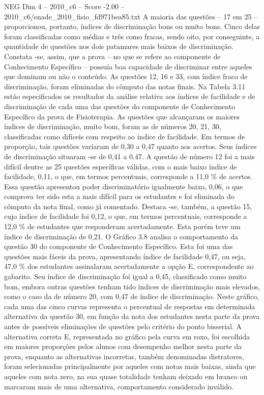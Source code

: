 \begin{textsample}{NEG Dim 4 – 2010\_c6 – Score -2.00 – 2010\_c6/enade\_2010\_fisio\_fd971bea85.txt}
A maioria das questões – 17 em 25 – proporcionou, portanto, índices de discriminação bons ou muito bons.
Cinco delas foram classificadas como médias e três como fracas, sendo oito, por conseguinte, a quantidade de questões nos dois patamares mais baixos de discriminação.
Constata -se, assim, que a prova – no que se refere ao componente de Conhecimento Específico – possuía boa capacidade de discriminar entre aqueles que dominam ou não o conteúdo.
As questões 12, 16 e 33, com índice fraco de discriminação, foram eliminadas do cômputo das notas finais.
Na Tabela 3.11 estão especificados os resultados da análise relativa aos índices de facilidade e de discriminação de cada uma das questões do componente de Conhecimento Específico da prova de Fisioterapia.
As questões que alcançaram os maiores índices de discriminação, muito bom, foram as de números 20, 21, 30, classificadas como difíceis com respeito ao índice de facilidade.
Em termos de proporção, tais questões variaram de 0,30 a 0,47 quanto aos acertos.
Seus índices de discriminação situaram -se de 0,41 a 0,47.
A questão de número 12 foi a mais difícil dentre as 25 questões específicas válidas, com o mais baixo índice de facilidade, 0,11, o que, em termos percentuais, corresponde a 11,0 \% de acertos.
Essa questão apresentou poder discriminatório igualmente baixo, 0,06, o que comprova ter sido esta a mais difícil para os estudantes e foi eliminada do cômputo da nota final, como já comentado.
Destaca -se, também, a questão 15, cujo índice de facilidade foi 0,12, o que, em termos percentuais, corresponde a 12,0 \% de estudantes que responderam acertadamente.
Esta porém teve um índice de discriminação de 0,21.
O Gráfico 3.8 analisa o comportamento da questão 30 do componente de Conhecimento Específico.
Esta foi uma das questões mais fáceis da prova, apresentando índice de facilidade 0,47, ou seja, 47,0 \% dos estudantes assinalaram acertadamente a opção E, correspondente ao gabarito.
Seu índice de discriminação foi igual a 0,45, classificado como muito bom, embora outras questões tenham tido índices de discriminação mais elevados, como o caso da de número 20, com 0,47 de índice de discriminação.
Neste gráfico, cada uma das cinco curvas representa o percentual de respostas em determinada alternativa da questão 30, em função da nota dos estudantes nesta parte da prova antes de possíveis eliminações de questões pelo critério do ponto bisserial.
A alternativa correta E, representada no gráfico pela curva em roxo, foi escolhida em maiores proporções pelos alunos com desempenho melhor nesta parte da prova, enquanto as alternativas incorretas, também denominadas distratores, foram selecionadas principalmente por aqueles com notas mais baixas, ainda que aqueles com nota zero, na sua quase totalidade tenham deixado em branco ou marcaram mais de uma alternativa, comportamento considerado inválido.

\end{textsample}
